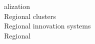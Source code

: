 \documentclass[a4paper]{article}
\begin{document}
\begin{multicols*}{2}
\begin{footnotesize}
alization \\ Regional clusters \\ Regional innovation systems \\ Regional
\end{footnotesize}
\end{multicols*}
\end{document}
